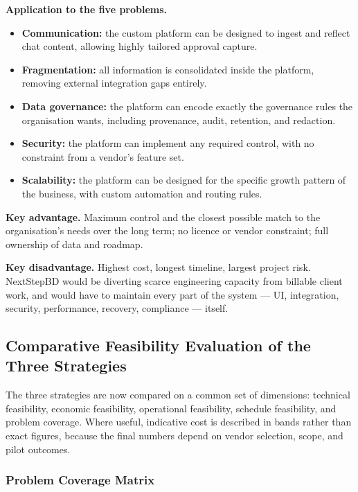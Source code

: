 \documentclass[12pt,a4paper]{report}
\begin{document}
\textbf{Application to the five problems.}
\begin{itemize}[leftmargin=1.6em]
    \item \textbf{Communication:} the custom platform can be designed to ingest and reflect
          chat content, allowing highly tailored approval capture.
    \item \textbf{Fragmentation:} all information is consolidated inside the platform, removing
          external integration gaps entirely.
    \item \textbf{Data governance:} the platform can encode exactly the governance rules the
          organisation wants, including provenance, audit, retention, and redaction.
    \item \textbf{Security:} the platform can implement any required control, with no
          constraint from a vendor's feature set.
    \item \textbf{Scalability:} the platform can be designed for the specific growth pattern of
          the business, with custom automation and routing rules.
\end{itemize}

\textbf{Key advantage.} Maximum control and the closest possible match to the organisation's
needs over the long term; no licence or vendor constraint; full ownership of data and
roadmap.

\textbf{Key disadvantage.} Highest cost, longest timeline, largest project risk. NextStepBD
would be diverting scarce engineering capacity from billable client work, and would have to
maintain every part of the system --- UI, integration, security, performance, recovery,
compliance --- itself.

\subsection{Comparative Feasibility Evaluation of the Three Strategies}
\label{sec:comparative-feasibility}

The three strategies are now compared on a common set of dimensions: technical feasibility,
economic feasibility, operational feasibility, schedule feasibility, and problem coverage.
Where useful, indicative cost is described in bands rather than exact figures, because the
final numbers depend on vendor selection, scope, and pilot outcomes.

\subsubsection{Problem Coverage Matrix}
\label{sec:coverage-matrix}
\end{document}
